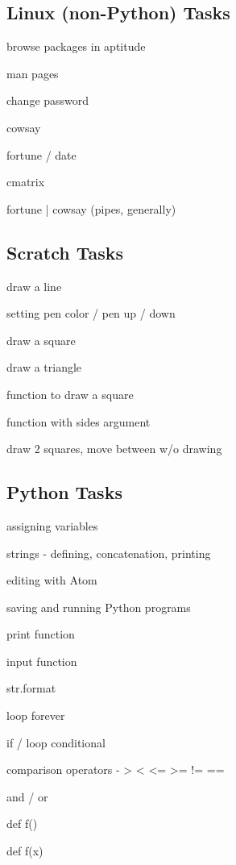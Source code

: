 \documentclass{article}
\begin{document}
\subsection*{Linux (non-Python) Tasks}
\begin{itemize*}
\item browse packages in aptitude
\item man pages
\item change password
\item cowsay
\item fortune / date
\item cmatrix
\item fortune | cowsay (pipes, generally)
\end{itemize*}

\subsection*{Scratch Tasks}
\begin{itemize*}
\item draw a line
\item setting pen color / pen up / down
\item draw a square
\item draw a triangle
\item function to draw a square
\item function with sides argument
\item draw 2 squares, move between w/o drawing
\end{itemize*}

\subsection*{Python Tasks}
\begin{itemize*}
\item assigning variables
\item strings - defining, concatenation, printing
\item editing with Atom
\item saving and running Python programs
\item print function
\item input function
\item str.format
\item loop forever
\item if / loop conditional
\item comparison operators - > < <= >= != ==
\item and / or
\item def f()
\item def f(x)
\end{itemize*}
\end{document}
